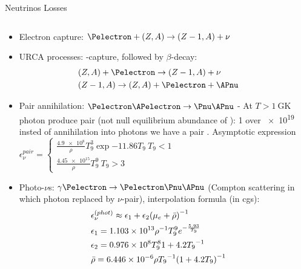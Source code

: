 \begin{frame}{Neutrinos Losses}
    \begin{columns}[T]
        \begin{column}{0.48\textwidth}
    \begin{itemize}
            \item Electron capture: $\Pelectron+(Z,A)\to(Z-1,A)+\nu$
            \item URCA processes: \Pelectron-capture, followed by $\beta$-decay:
                \begin{align*}
                    &(Z,A)+\Pelectron\to(Z-1,A)+\nu\\
                    &(Z-1,A)\to(Z,A)+\Pelectron+\APnu
                \end{align*}
                    \item Pair annihilation: $\Pelectron\APelectron\to\Pnu\APnu$ - At $T>\SI{1}{\giga\kelvin}$ photon produce \Pelectron\APelectron pair (not null equilibrium abundance of \APelectron): 1 over \num{e19} insted of annihilation into photons we have a pair \Pnu\APnu. Asymptotic expression $\epsilon_{\nu}^{pair}=\left\{
                        \begin{array}{l}
                                \frac{\num{4.9e8}}{\rho}T_9^3\exp{-11.86T_9}\ T_9<1\\
                                \frac{\num{4.45e15}}{\rho}T_9^9\ T_9>3
                        \end{array}
                    \right.$
                    \item Photo-$\nu$s: $\gamma\Pelectron\to\Pelectron\Pnu\APnu$ (Compton scattering in which photon replaced by $\nu$-pair), interpolation formula (in cgs):
                        \begin{align*}
                        &\epsilon_{\nu}^{(phot)}\approx\epsilon_1+\epsilon_2{(\mu_e+\bar{\rho})}^{-1}\\
                        &\epsilon_1=\num{1.103e13}{\rho}^{-1}T_9^9e^{-\frac{5.93}{T_9}}\\
                        &\epsilon_2=\num{0.976e8}T_9^8{1+4.2T_9}^{-1}\\
                        &\bar{\rho}=\num{6.446e-6}\rho{T_9}^{-1}{(1+4.2T_9)}^{-1}
                        \end{align*}
        \end{itemize}
        \end{column}
        \begin{column}{0.52\textwidth}

\end{column}
\end{columns}
\end{frame}
